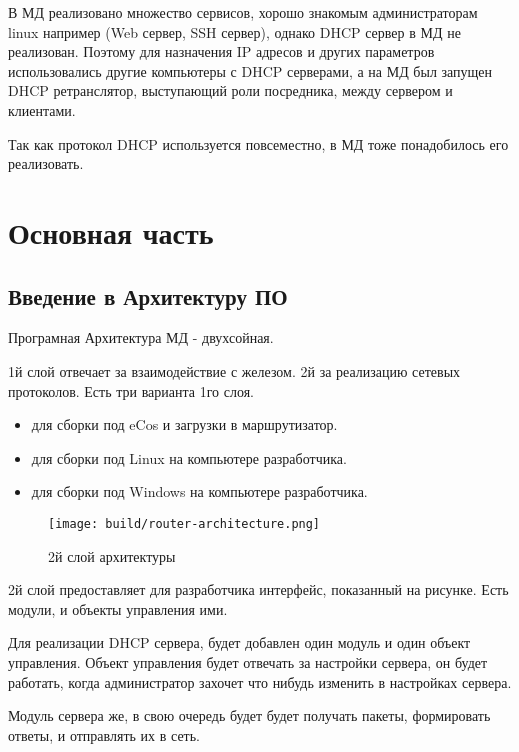 \documentclass[12pt]{article}
\begin{document}
В МД реализовано множество сервисов, хорошо знакомым администраторам linux например (Web сервер, SSH сервер), однако DHCP сервер в МД не реализован. Поэтому для назначения IP адресов и других параметров использовались другие компьютеры с DHCP серверами, а на МД был запущен DHCP ретранслятор, выступающий роли посредника, между сервером и клиентами.

Так как протокол DHCP используется повсеместно, в МД тоже понадобилось его реализовать.




\pagebreak
\section{Основная часть}

\subsection{Введение в Архитектуру ПО}

Програмная Архитектура МД - двухсойная.

1й слой отвечает за взаимодействие с железом. 2й за реализацию сетевых протоколов.
Есть три варианта 1го слоя.

\begin{itemize}
    \item для сборки под eCos и загрузки в маршрутизатор.
    \item для сборки под Linux на компьютере разработчика.
    \item для сборки под Windows на компьютере разработчика.
\end{itemize}

\begin{figure}[H]
    \texttt{[image: build/router-architecture.png]}
    \caption{2й слой архитектуры}
\end{figure}

2й слой предоставляет для разработчика интерфейс, показанный на рисунке.
Есть модули, и объекты управления ими.

Для реализации DHCP сервера, будет добавлен один модуль и один объект управления.
Объект управления будет отвечать за настройки сервера, он будет работать, когда администратор захочет что нибудь изменить в настройках сервера.

Модуль сервера же, в свою очередь будет будет получать пакеты, формировать ответы, и отправлять их в сеть.
\end{document}
